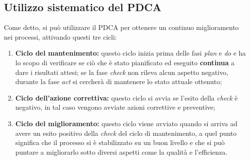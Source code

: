 \subsection{Utilizzo sistematico del PDCA}
Come detto, si può utilizzare il PDCA per ottenere un continuo miglioramento nei processi, attivando questi tre cicli:
\begin{enumerate}
	\item{\bf Ciclo del mantenimento:} questo ciclo inizia prima delle fasi \emph{plan} e \emph{do} e ha lo scopo di verificare se ciò che è stato pianificato ed eseguito \textbf{continua} a dare i risultati attesi; se la fase \emph{check} non rileva alcun aspetto negativo, durante la fase \emph{act} si cercherà di mantenere lo stato attuale ottenuto;
	\item{\bf Ciclo dell'azione correttiva:} questo ciclo si avvia se l'esito della \emph{check} è negativo, in tal caso vengono avviate azioni correttive e preventive;
	\item{\bf Ciclo del miglioramento:} questo ciclo viene avviato quando si arriva ad avere un esito positivo della \emph{check} del ciclo di mantenimento, a quel punto significa che il processo si è stabilizzato su un buon livello e che si può puntare a migliorarlo sotto diversi aspetti come la qualità e l'efficienza.
\end{enumerate}